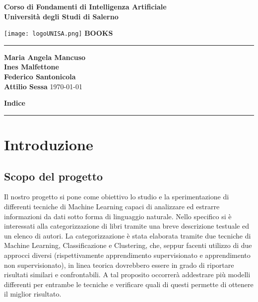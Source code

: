 \documentclass[12pt,oneside]{article}
\begin{document}
\begin{titlepage}
    \begin{flushright}
        \textbf{Corso di Fondamenti di Intelligenza Artificiale}
        \textbf{\\Università degli Studi di Salerno}
    \end{flushright}
    \vspace*{1.5cm}
    \centering
    \texttt{[image: logoUNISA.png]}
    \vfill
    \Huge\textbf{BOOKS}
    \vspace{1ex}
    \rule{\linewidth}{1pt}
    \Large\textbf{Maria Angela Mancuso \\
        Ines Malfettone \\
        Federico Santonicola \\
        Attilio Sessa}
    \vfill
    \today
\end{titlepage}

\clearpage %

\setcounter{page}{1}

\begin{flushright}
        \Large\textbf{Indice}
\end{flushright}
\rule{\linewidth}{1pt}

\renewcommand{\contentsname}{}
\tableofcontents

\clearpage
\setcounter{section}{0}
\section{Introduzione}
    \begin{enumerate}
    \subsection{Scopo del progetto}
    \begin{justify}
    
        Il nostro progetto si pone come obiettivo lo studio e la sperimentazione di differenti tecniche di Machine Learning capaci di analizzare ed estrarre informazioni da dati sotto forma di linguaggio naturale. Nello specifico si è interessati alla categorizzazione di libri tramite una breve descrizione testuale ed un elenco di autori. La categorizzazione è stata elaborata tramite due tecniche di Machine Learning, Classificazione e Clustering, che, seppur facenti utilizzo di due approcci diversi (rispettivamente apprendimento supervisionato e apprendimento non supervisionato), in linea teorica dovrebbero essere in grado di riportare risultati similari e confrontabili. A tal proposito occorrerà addestrare più modelli differenti per entrambe le tecniche e verificare quali di questi permette di ottenere il miglior risultato.

    \end{justify}
    \end{enumerate}
\end{document}
